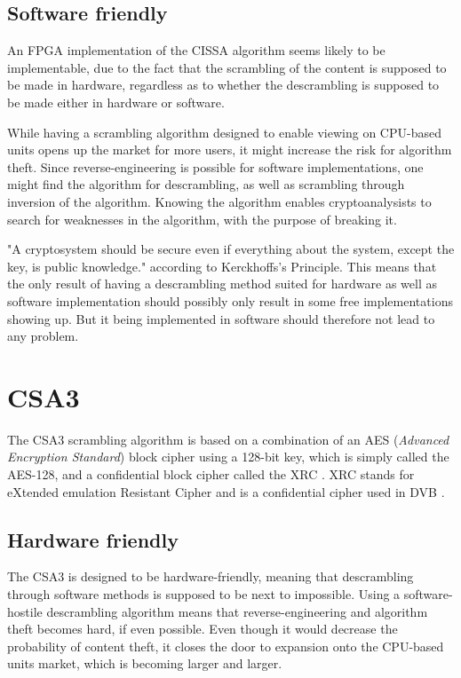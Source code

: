 \subsection{Software friendly}
An FPGA implementation of the CISSA algorithm seems likely to be implementable, 
due to the fact that the scrambling of the content is supposed to be made in 
hardware, regardless as to whether the descrambling is supposed to be made 
either in hardware or software.

While having a scrambling algorithm designed to enable viewing on CPU-based units
opens up the market for more users, it might increase the risk for algorithm 
theft. Since reverse-engineering is possible for software implementations, one 
might find the algorithm for descrambling, as well as scrambling through 
inversion of the algorithm. Knowing the algorithm enables cryptoanalysists to 
search for weaknesses in the algorithm, with the purpose of breaking it.

"A cryptosystem should be secure even if everything about the system, except the 
key, is public knowledge." according to Kerckhoffs's Principle.
This means that the only result of having a descrambling method suited for 
hardware as well as software implementation should possibly only result in some 
free implementations showing up. But it being implemented in software should 
therefore not lead to any problem.

\section{CSA3}
The CSA3 scrambling algorithm is based on a combination of an AES 
(\emph{Advanced Encryption Standard}) block cipher using a 128-bit key, which is 
simply called the AES-128, and a confidential block cipher called the XRC 
\citep[p. 8]{DVB:2013}. XRC stands for eXtended emulation Resistant Cipher and 
is a confidential cipher used in DVB \citep[p. 8]{DVB:2013}.

\subsection{Hardware friendly}
The CSA3 is designed to be hardware-friendly, meaning that descrambling through 
software methods is supposed to be next to impossible. Using a software-hostile 
descrambling algorithm means that reverse-engineering and algorithm theft becomes
hard, if even possible. Even though it would decrease the probability of content 
theft, it closes the door to expansion onto the CPU-based units market, which is 
becoming larger and larger.

